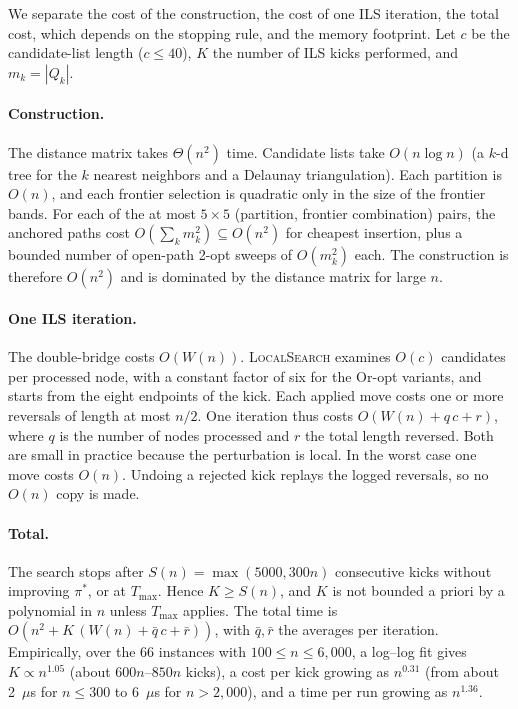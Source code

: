 \documentclass[runningheads]{llncs}
\begin{document}
We separate the cost of the construction, the cost of one ILS
iteration, the total cost, which depends on the stopping rule, and the
memory footprint. Let $c$ be the candidate-list length ($c\le 40$),
$K$ the number of ILS kicks performed, and $m_k=|Q_k|$.

\paragraph{Construction.} The distance matrix takes $\Theta(n^2)$ time.
Candidate lists take $O(n\log n)$ (a $k$-d tree for the $k$ nearest
neighbors and a Delaunay triangulation). Each partition is $O(n)$, and
each frontier selection is quadratic only in the size of the frontier
bands. For each of the at most $5\times5$ (partition, frontier
combination) pairs, the anchored paths cost $O(\sum_k m_k^2)\subseteq
O(n^2)$ for cheapest insertion, plus a bounded number of open-path 2-opt
sweeps of $O(m_k^2)$ each. The construction is therefore $O(n^2)$ and is
dominated by the distance matrix for large $n$.

\paragraph{One ILS iteration.} The double-bridge costs $O(W(n))$.
\textsc{LocalSearch} examines $O(c)$ candidates per processed node,
with a constant factor of six for the Or-opt variants, and starts from
the eight endpoints of the kick. Each applied move costs one or more
reversals of length at most $n/2$. One iteration thus costs
$O(W(n)+q\,c+r)$, where $q$ is the number of nodes processed and $r$
the total length reversed. Both are small in practice because the
perturbation is local. In the worst case one move costs $O(n)$. Undoing
a rejected kick replays the logged reversals, so no $O(n)$ copy is made.

\paragraph{Total.} The search stops after $S(n)=\max(5000,300n)$
consecutive kicks without improving $\pi^*$, or at $T_{\max}$. Hence
$K\ge S(n)$, and $K$ is not bounded a priori by a polynomial in $n$
unless $T_{\max}$ applies. The total time is
$O(n^2+K\,(W(n)+\bar q\,c+\bar r))$, with $\bar q,\bar r$ the averages
per iteration. Empirically, over the 66 instances with
$100\le n\le 6{,}000$, a log--log fit gives $K\propto n^{1.05}$
(about $600n$--$850n$ kicks), a cost per kick growing as $n^{0.31}$
(from about 2~$\mu$s for $n\le 300$ to 6~$\mu$s for $n>2{,}000$), and a
time per run growing as $n^{1.36}$.
\end{document}
